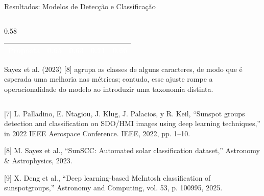 \documentclass[aspectratio=169]{beamer}
\begin{document}
\begin{frame}{Resultados: Modelos de Detecção e Classificação}
\begin{columns}[c, onlytextwidth]
\begin{column}{0.58\textwidth}
\begin{table}
\begin{tabular}{lcccc}
                    \cellcolor{azulPropuesta}\textcolor{white}{\textbf{Proposta}} & 
                    \cellcolor{azulPropuesta}\textcolor{white}{\textbf{0.65}} & 
                    \cellcolor{azulPropuesta}\textcolor{white}{\textbf{0.63}} & 
                    \cellcolor{azulPropuesta}\textcolor{white}{\textbf{0.71}} & 
                    \cellcolor{azulPropuesta}\textcolor{white}{\textbf{0.66}} \\
                    \bottomrule
                \end{tabular}
            \end{table}

            \vspace{0.15cm}

            \scriptsize
            Sayez et al. (2023) [8] agrupa as classes de alguns caracteres, de modo que é esperada uma melhoria nas métricas; contudo, esse ajuste rompe a operacionalidade do modelo ao introduzir uma taxonomia distinta.
            
        \end{column}
        
    \end{columns}

    \vfill

    {\raggedright\tiny\color{gray}
    [7] L. Palladino, E. Ntagiou, J. Klug, J. Palacios, y R. Keil, “Sunspot groups detection and classification on SDO/HMI images using deep learning techniques,” in 2022 IEEE Aerospace Conference. IEEE, 2022, pp. 1–10. \par\vspace{0.03cm}
    [8] M. Sayez et al., “SunSCC: Automated solar classification dataset,” Astronomy \& Astrophysics, 2023. \par\vspace{0.03cm}
    [9] X. Deng et al., “Deep learning-based McIntosh classification of sunspotgroups,” Astronomy and Computing, vol. 53, p. 100995, 2025.\par}
\end{frame}
\end{document}
